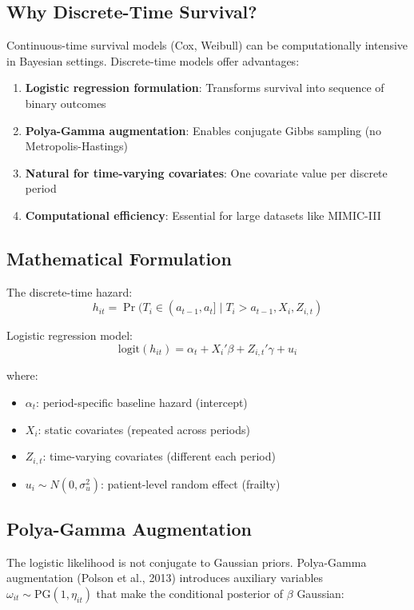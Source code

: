 \documentclass[11pt]{article}
\begin{document}
\subsection{Why Discrete-Time Survival?}

Continuous-time survival models (Cox, Weibull) can be computationally intensive in Bayesian settings. Discrete-time models offer advantages:

\begin{enumerate}[leftmargin=*, nosep]
    \item \textbf{Logistic regression formulation}: Transforms survival into sequence of binary outcomes
    \item \textbf{Polya-Gamma augmentation}: Enables conjugate Gibbs sampling (no Metropolis-Hastings)
    \item \textbf{Natural for time-varying covariates}: One covariate value per discrete period
    \item \textbf{Computational efficiency}: Essential for large datasets like MIMIC-III
\end{enumerate}

\subsection{Mathematical Formulation}

The discrete-time hazard:
\[
h_{it} = \Pr(T_i \in (a_{t-1}, a_t] \mid T_i > a_{t-1}, X_i, Z_{i,t})
\]

Logistic regression model:
\[
\text{logit}(h_{it}) = \alpha_t + X_i'\beta + Z_{i,t}'\gamma + u_i
\]

where:
\begin{itemize}[leftmargin=*, nosep]
    \item $\alpha_t$: period-specific baseline hazard (intercept)
    \item $X_i$: static covariates (repeated across periods)
    \item $Z_{i,t}$: time-varying covariates (different each period)
    \item $u_i \sim N(0, \sigma^2_u)$: patient-level random effect (frailty)
\end{itemize}

\subsection{Polya-Gamma Augmentation}

The logistic likelihood is not conjugate to Gaussian priors. Polya-Gamma augmentation (Polson et al., 2013) introduces auxiliary variables $\omega_{it} \sim \text{PG}(1, \eta_{it})$ that make the conditional posterior of $\beta$ Gaussian:
\end{document}
